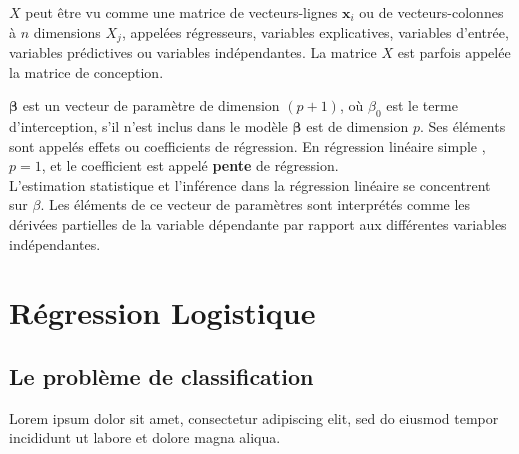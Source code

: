 	$X$ peut être vu comme une matrice de vecteurs-lignes $\mathbf {x} _{i}$ ou de vecteurs-colonnes à $n$ dimensions $X_{j}$, appelées régresseurs, variables explicatives, variables d'entrée, variables prédictives ou variables indépendantes. La matrice $X$ est parfois appelée la matrice de conception. 
	
	${\boldsymbol {\beta}}$ est un vecteur de paramètre de dimension $(p+1)$, où $\beta _{0}$ est le terme d'interception, s'il n'est inclus dans le modèle ${\boldsymbol {\beta}}$ est de dimension $p$. Ses éléments sont appelés effets ou coefficients de régression. 
	En régression linéaire simple , $p = 1$, et le coefficient est appelé \textbf{pente} de régression.\\
	L'estimation statistique et l'inférence dans la régression linéaire se concentrent sur $\beta$. Les éléments de ce vecteur de paramètres sont interprétés comme les dérivées partielles de la variable dépendante par rapport aux différentes variables indépendantes.
		
	
	
	\section{Régression Logistique}
	\subsection{Le problème de classification}
		Lorem ipsum dolor sit amet, consectetur adipiscing elit, sed do eiusmod tempor incididunt ut labore et dolore magna aliqua.
